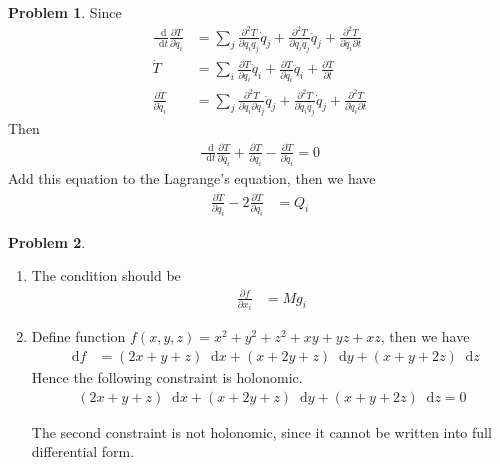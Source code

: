 \documentclass[twoside,11pt]{article}
\renewcommand*\d{\mathop{}\!\mathrm{d}}
\theoremstyle{definition}
\newtheorem{problem}{Problem}
\theoremstyle{remark}
\begin{document}
\begin{problem}
Since
\begin{align*}
    \frac{\d}{\d t}\frac{\partial T}{\partial\dot{q}_i} &= 
    \sum_j
    \frac{\partial^2 T}{\partial\dot{q}_i q_j}\dot{q}_j +
    \frac{\partial^2 T}{\partial\dot{q}_i \dot{q}_j}\ddot{q}_j
    + \frac{\partial^2 T}{\partial\dot{q}_i\partial t}\\
    \dot{T} &= \sum_i\frac{\partial T}{\partial q_i}\dot{q}_i
    + \frac{\partial T}{\partial\dot{q}_i}\ddot{q}_i
    + \frac{\partial T}{\partial t}\\
    \frac{\partial\dot{T}}{\partial\dot{q}_i} &=
    \sum_j\frac{\partial^2 T}{\partial\dot{q}_i\partial\dot{q}_j}\ddot{q}_j
    + \frac{\partial^2 T}{\partial\dot{q}_i q_j}\dot{q}_j
    + \frac{\partial^2 T}{\partial\dot{q}_i\partial t}
\end{align*}
Then
\begin{align*}
    \frac{\d}{\d t}\frac{\partial T}{\partial \dot{q}_i}
    + \frac{\partial T}{\partial q_i}
    - \frac{\partial\dot{T}}{\partial\dot{q}_i} 
    = 0
\end{align*}
Add this equation to the Lagrange's equation, then we have
\begin{align*}
    \frac{\partial\dot{T}}{\partial\dot{q}_i}
    - 2\frac{\partial T}{\partial q_i} &= Q_i
\end{align*}

\end{problem}


\begin{problem}\
\begin{enumerate}[label=(\alph*)]
\item The condition should be
\begin{align*}
    \frac{\partial f}{\partial x_i} &= 
    Mg_i
\end{align*}

\item Define function $f(x, y, z) = x^2+y^2+z^2+xy+yz+xz$, then we have
\begin{align*}
    \d f &= 
    (2x+y+z)\d x + (x+2y+z)\d y + (x+y+2z)\d z
\end{align*}
Hence the following constraint is holonomic.
\begin{align*}
    (2x+y+z)\d x + (x+2y+z)\d y + (x+y+2z)\d z = 0
\end{align*}

The second constraint is not holonomic, since it cannot be written 
into full differential form.

\end{enumerate}
\end{problem}
\end{document}
